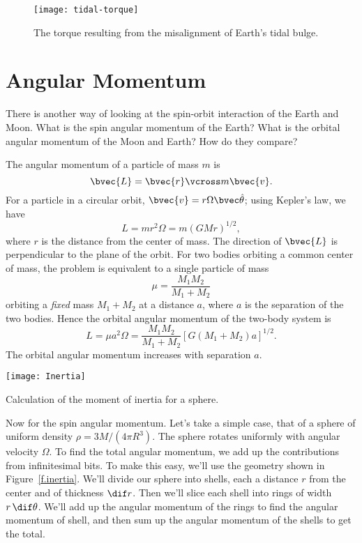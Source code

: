 \begin{figure*}
\texttt{[image: tidal-torque]}
\caption[Torque on the Earth's tidal bulge]{The torque resulting from the misalignment of Earth's tidal bulge.
\label{f.tidal-torque}}
\end{figure*}

\section{Angular Momentum}\label{s.angular-momentum}
There is another way of looking at the spin-orbit interaction of the Earth and Moon.  What is the spin angular momentum of the Earth? What is the orbital angular momentum of the Moon and Earth? How do they compare?

The angular momentum of a particle of mass $m$ is
\begin{equation}\label{e.def-L}
	\bvec{L} = \bvec{r}\vcross m\bvec{v}.
\end{equation}
For a particle in a circular orbit, $\bvec{v} = r\Omega \thetahat$; using Kepler's law, we have
\[	L = mr^{2}\Omega = m\left(GMr\right)^{1/2}, \]
where $r$ is the distance from the center of mass.  The direction of $\bvec{L}$ is perpendicular to the plane of the orbit.  For two bodies orbiting a common center of mass, the problem is equivalent to a single particle of mass
\[ \mu = \frac{M_{1}M_{2}}{M_{1}+M_{2}} \]
orbiting a \emph{fixed} mass $M_{1}+M_{2}$ at a distance $a$, where $a$ is the separation of the two bodies.  Hence the orbital angular momentum of the two-body system is
\begin{equation}\label{orbital-2-two-body}
	L = \mu a^{2}\Omega = \frac{M_{1}M_{2}}{M_{1}+M_{2}}\left[G\left(M_{1}+M_{2}\right)a\right]^{1/2}.
\end{equation}
The orbital angular momentum increases with separation $a$.

\begin{marginfigure}
\texttt{[image: Inertia]}
\caption{Calculation of the moment of inertia for a sphere. \label{f.inertia}}
\end{marginfigure}

Now for the spin angular momentum.  Let's take a simple case, that of a sphere of uniform density $\rho = 3M/(4\pi R^{3})$.  The sphere rotates uniformly with angular velocity $\Omega$.  To find the total angular momentum, we add up the contributions from infinitesimal bits.  To make this easy, we'll use the geometry shown in Figure~\ref{f.inertia}.  We'll divide our sphere into shells, each a distance $r$ from the center and of thickness $\dif r$.  Then we'll slice each shell into rings of width $r\,\dif\theta$.  We'll add up the angular momentum of the rings to find the angular momentum of shell, and then sum up the angular momentum of the shells to get the total.

